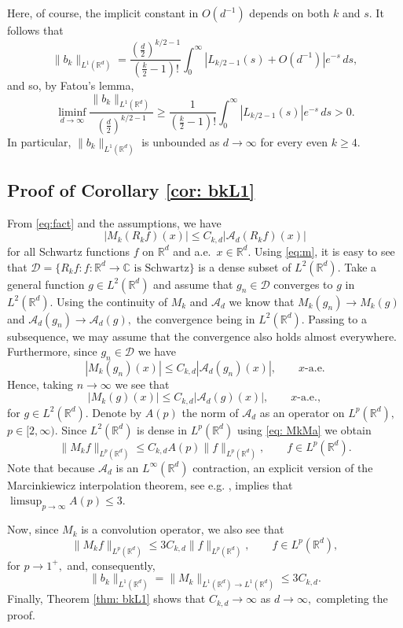 \documentclass[a4paper,12pt,reqno]{amsart}
\numberwithin{equation}{section}
\theoremstyle{definition}
\newcommand{\C}{\mathbb{C}}
\newcommand{\R}{\mathbb{R}}
\newcommand{\mA}{\mathcal{A}}
\newcommand{\mD}{\mathcal{D}}
\renewcommand{\le}{\leqslant}
\renewcommand{\ge}{\geqslant}
\begin{document}
Here, of course, the implicit constant in $O(d^{-1})$ depends on both $k$ and $s$. It follows that
\[
\|b_k\|_{L^1(\R^d)} = \frac{(\tfrac{d}{2})^{k/2 - 1}}{(\frac{k}{2} - 1)!} \int_0^\infty |L_{k/2 - 1}(s) + O(d^{-1})| e^{-s} \, ds ,
\]
and so, by Fatou's lemma,
\begin{equation}
\label{eq: bkLag}
\liminf_{d \to \infty} \frac{\|b_k\|_{L^1(\R^d)}}{(\frac{d}{2})^{k / 2 - 1}} \ge \frac{1}{(\frac{k}{2} - 1)!} \int_0^\infty |L_{k/2 - 1}(s)| e^{-s} \, ds > 0 .
\end{equation}
In particular, $\|b_k\|_{L^1(\R^d)}$ is unbounded as $d \to \infty$ for every even $k \ge 4$.

\subsection{Proof of  Corollary \ref{cor: bkL1}}
From \eqref{eq:fact} and the assumptions, we have
\[
|M_k(R_k f)(x)|\le C_{k,d} |\mA_d(R_k f)(x)|
\]
for all Schwartz functions $f$ on $\R^d$ and a.e.\ $x\in \R^d.$ Using \eqref{eq:m}, it is easy to see that $\mD= \{ R_k f \colon f\colon \R^d\to \C  \textrm{ is Schwartz}\}$ is a dense subset of $L^2(\R^d).$ Take a general function $g\in L^2(\R^d)$ and assume that $g_n\in \mD$ converges to $g$ in  $L^2(\R^d).$ Using the continuity of $M_k$ and $\mA_d$ we know that $M_k(g_n)\to M_k(g)$ and $\mA_d(g_n)\to \mA_d(g),$ the convergence being in $L^2(\R^d).$ Passing to a subsequence, we may assume that the convergence also holds almost everywhere. Furthermore, since $g_n\in \mD$ we have
\[
|M_k(g_n)(x)|\le C_{k,d} |\mA_d(g_n)(x)|,\qquad x\textrm{-a.e.}
\]
Hence, taking $n\to \infty$ we see that
\begin{equation}
\label{eq: MkMa}
|M_k(g)(x)|\le C_{k,d} |\mA_d(g)(x)|,\qquad x\textrm{-a.e.},
\end{equation}
for $g\in L^2(\R^d).$ Denote by $A(p)$ the norm of $\mA_d$ as an operator on $L^p(\R^d),$ $p\in [2,\infty).$ Since $L^2(\R^d)$ is dense in $L^p(\R^d)$ using \eqref{eq: MkMa} we obtain
\[
\|M_k f\|_{L^p(\R^d)}\le C_{k,d} A(p) \|f\|_{L^p(\R^d)},\qquad f\in L^p(\R^d).
\]
 Note that because $\mA_d$ is an $L^{\infty}(\R^d)$ contraction, an explicit version of the Marcinkiewicz interpolation theorem, see e.g. \cite[Theorem 1.3.2]{grafakos}, implies that $\limsup_{p\to\infty} A(p) \le 3.$

Now, since $M_k$ is a convolution operator, we also see that
\[
\|M_k f\|_{L^p(\R^d)}\le 3C_{k,d} \|f\|_{L^p(\R^d)},\qquad f\in L^p(\R^d),
\]
for $p\to 1^+,$ and, consequently,
\[
\|b_k\|_{L^1(\R^d)}=\|M_k \|_{L^1(\R^d)\to L^1(\R^d)}\le 3C_{k,d}.
\]
Finally, Theorem \ref{thm: bkL1} shows that $C_{k,d}\to \infty$ as $d\to \infty,$ completing the proof. 
\end{document}
